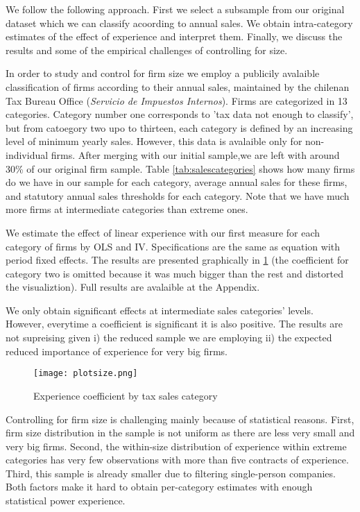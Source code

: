 We follow the following approach. First we select a subsample from our original dataset which we can classify acoording to annual sales.  We obtain intra-category estimates of the effect of experience and interpret them. Finally, we discuss the results and some of the empirical challenges of controlling for size.

In order to study and control for firm size we employ a publicily avalaible classification of firms according to their annual sales, maintained by the chilenan Tax Bureau Office (\textit{Servicio de Impuestos Internos}). Firms are categorized in 13 categories. Category number one  corresponds to 'tax data not enough to classify', but from catoegory two upo to thirteen, each category is defined by an increasing level of minimum yearly sales.  However, this data is avalaible only for non-individual firms. After merging with our initial sample,we are left with around 30\% of our original firm sample. Table \ref{tab:salescategories} shows how many firms do we have in our sample for each category, average annual sales for these firms, and statutory annual sales thresholds for each category. Note that we have much more firms at intermediate categories than extreme ones.



We estimate the effect of linear experience with our first measure for each category of firms by OLS and IV. Specifications are the same as equation with period fixed effects. The results are presented graphically in \ref{fig:sizeestimates} (the coefficient for category two is omitted because it was much bigger than the rest and distorted the visualiztion). Full results are avalaible at the Appendix.

We only obtain significant effects at intermediate sales categories' levels. However, everytime a coefficient is significant it is also positive. The results are not supreising given i) the reduced sample we are employing ii) the expected reduced importance of experience for very big firms.

\begin{figure}
  \texttt{[image: plotsize.png]}
  \caption{Experience coefficient by tax sales category}
  \label{fig:sizeestimates}
\end{figure}

Controlling for firm size is challenging mainly because of statistical reasons. First, firm size distribution in the sample is not uniform as there are less very small and very big firms. Second, the within-size distribution of experience within extreme categories has very few observations with more than five contracts of experience. Third, this sample is already smaller due to filtering single-person companies. Both factors make it hard to obtain per-category estimates with enough statistical power experience.

